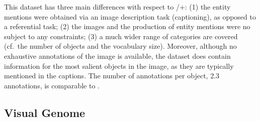 This dataset has three main differences with respect to /+: (1) the entity mentions were obtained via an image description task (captioning), as opposed to a referential task; (2) the images and the production of entity mentions were no subject to any constraints; (3) a much wider range of categories are covered (cf.\ the number of objects and the vocabulary size). 
Moreover, although no exhaustive annotations of the image is available, the dataset does contain information for the most salient objects in the image, as they are typically mentioned in the captions.
The number of annotations per object, 2.3 annotations, is comparable to .


\subsection{Visual Genome}

